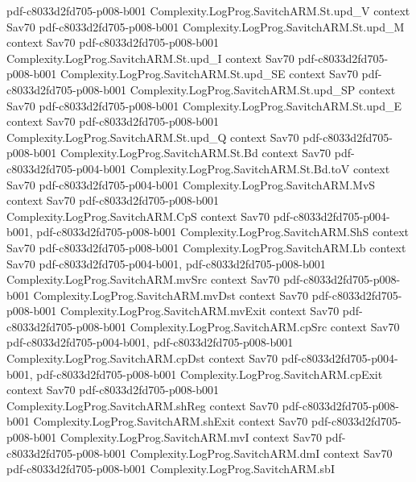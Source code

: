 \begin{theorem}
  {pdf-c8033d2fd705-p008-b001}
\proofstep
  {Complexity.LogProg.SavitchARM.St.upd_V}
  {context}
  {Sav70}
  {pdf-c8033d2fd705-p008-b001}
\proofstep
  {Complexity.LogProg.SavitchARM.St.upd_M}
  {context}
  {Sav70}
  {pdf-c8033d2fd705-p008-b001}
\proofstep
  {Complexity.LogProg.SavitchARM.St.upd_I}
  {context}
  {Sav70}
  {pdf-c8033d2fd705-p008-b001}
\proofstep
  {Complexity.LogProg.SavitchARM.St.upd_SE}
  {context}
  {Sav70}
  {pdf-c8033d2fd705-p008-b001}
\proofstep
  {Complexity.LogProg.SavitchARM.St.upd_SP}
  {context}
  {Sav70}
  {pdf-c8033d2fd705-p008-b001}
\proofstep
  {Complexity.LogProg.SavitchARM.St.upd_E}
  {context}
  {Sav70}
  {pdf-c8033d2fd705-p008-b001}
\proofstep
  {Complexity.LogProg.SavitchARM.St.upd_Q}
  {context}
  {Sav70}
  {pdf-c8033d2fd705-p008-b001}
\proofstep
  {Complexity.LogProg.SavitchARM.St.Bd}
  {context}
  {Sav70}
  {pdf-c8033d2fd705-p004-b001}
\proofstep
  {Complexity.LogProg.SavitchARM.St.Bd.toV}
  {context}
  {Sav70}
  {pdf-c8033d2fd705-p004-b001}
\proofstep
  {Complexity.LogProg.SavitchARM.MvS}
  {context}
  {Sav70}
  {pdf-c8033d2fd705-p008-b001}
\proofstep
  {Complexity.LogProg.SavitchARM.CpS}
  {context}
  {Sav70}
  {pdf-c8033d2fd705-p004-b001,
    pdf-c8033d2fd705-p008-b001}
\proofstep
  {Complexity.LogProg.SavitchARM.ShS}
  {context}
  {Sav70}
  {pdf-c8033d2fd705-p008-b001}
\proofstep
  {Complexity.LogProg.SavitchARM.Lb}
  {context}
  {Sav70}
  {pdf-c8033d2fd705-p004-b001,
    pdf-c8033d2fd705-p008-b001}
\proofstep
  {Complexity.LogProg.SavitchARM.mvSrc}
  {context}
  {Sav70}
  {pdf-c8033d2fd705-p008-b001}
\proofstep
  {Complexity.LogProg.SavitchARM.mvDst}
  {context}
  {Sav70}
  {pdf-c8033d2fd705-p008-b001}
\proofstep
  {Complexity.LogProg.SavitchARM.mvExit}
  {context}
  {Sav70}
  {pdf-c8033d2fd705-p008-b001}
\proofstep
  {Complexity.LogProg.SavitchARM.cpSrc}
  {context}
  {Sav70}
  {pdf-c8033d2fd705-p004-b001,
    pdf-c8033d2fd705-p008-b001}
\proofstep
  {Complexity.LogProg.SavitchARM.cpDst}
  {context}
  {Sav70}
  {pdf-c8033d2fd705-p004-b001,
    pdf-c8033d2fd705-p008-b001}
\proofstep
  {Complexity.LogProg.SavitchARM.cpExit}
  {context}
  {Sav70}
  {pdf-c8033d2fd705-p008-b001}
\proofstep
  {Complexity.LogProg.SavitchARM.shReg}
  {context}
  {Sav70}
  {pdf-c8033d2fd705-p008-b001}
\proofstep
  {Complexity.LogProg.SavitchARM.shExit}
  {context}
  {Sav70}
  {pdf-c8033d2fd705-p008-b001}
\proofstep
  {Complexity.LogProg.SavitchARM.mvI}
  {context}
  {Sav70}
  {pdf-c8033d2fd705-p008-b001}
\proofstep
  {Complexity.LogProg.SavitchARM.dmI}
  {context}
  {Sav70}
  {pdf-c8033d2fd705-p008-b001}
\proofstep
  {Complexity.LogProg.SavitchARM.sbI}

\end{theorem}
